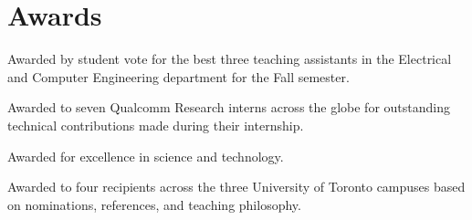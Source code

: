 \section{\sc Awards}

{
  Awarded by student vote for the best three teaching assistants in the Electrical and Computer Engineering department for the Fall semester.
}

{
  Awarded to seven Qualcomm Research interns across the globe for outstanding technical contributions made during their internship.
}

{
  Awarded for excellence in science and technology.
}

{
  Awarded to four recipients across the three University of Toronto campuses based on nominations, references, and teaching philosophy.
}
